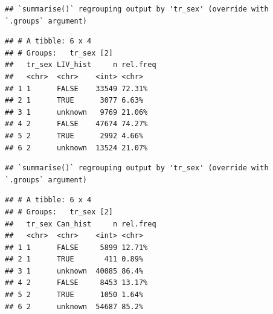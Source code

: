 \documentclass[
]{article}
\newenvironment{Shaded}{\begin{snugshade}}{\end{snugshade}}
\newcommand{\DataTypeTok}[1]{\textcolor[rgb]{0.13,0.29,0.53}{#1}}
\newcommand{\DecValTok}[1]{\textcolor[rgb]{0.00,0.00,0.81}{#1}}
\newcommand{\KeywordTok}[1]{\textcolor[rgb]{0.13,0.29,0.53}{\textbf{#1}}}
\newcommand{\NormalTok}[1]{#1}
\newcommand{\OperatorTok}[1]{\textcolor[rgb]{0.81,0.36,0.00}{\textbf{#1}}}
\newcommand{\OtherTok}[1]{\textcolor[rgb]{0.56,0.35,0.01}{#1}}
\newcommand{\StringTok}[1]{\textcolor[rgb]{0.31,0.60,0.02}{#1}}
\begin{document}
\begin{verbatim}
## `summarise()` regrouping output by 'tr_sex' (override with `.groups` argument)
\end{verbatim}

\begin{verbatim}
## # A tibble: 6 x 4
## # Groups:   tr_sex [2]
##   tr_sex LIV_hist     n rel.freq
##   <chr>  <chr>    <int> <chr>   
## 1 1      FALSE    33549 72.31%  
## 2 1      TRUE      3077 6.63%   
## 3 1      unknown   9769 21.06%  
## 4 2      FALSE    47674 74.27%  
## 5 2      TRUE      2992 4.66%   
## 6 2      unknown  13524 21.07%
\end{verbatim}

\begin{Shaded}
\end{Shaded}

\begin{verbatim}
## `summarise()` regrouping output by 'tr_sex' (override with `.groups` argument)
\end{verbatim}

\begin{verbatim}
## # A tibble: 6 x 4
## # Groups:   tr_sex [2]
##   tr_sex Can_hist     n rel.freq
##   <chr>  <chr>    <int> <chr>   
## 1 1      FALSE     5899 12.71%  
## 2 1      TRUE       411 0.89%   
## 3 1      unknown  40085 86.4%   
## 4 2      FALSE     8453 13.17%  
## 5 2      TRUE      1050 1.64%   
## 6 2      unknown  54687 85.2%
\end{verbatim}

\begin{Shaded}
\end{Shaded}
\end{document}

